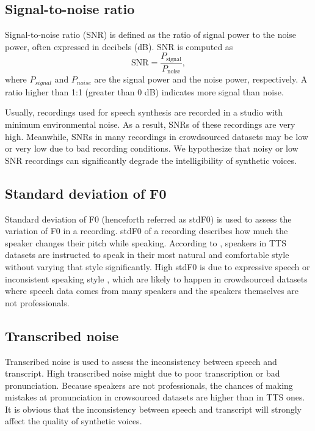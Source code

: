 \documentclass[12pt]{article}
\begin{document}
\subsection{Signal-to-noise ratio}
Signal-to-noise ratio (SNR) is defined as the ratio of signal power to the noise power, often expressed in decibels (dB). SNR is computed as
\begin{equation}\label{exp_SNR}
    \text{SNR} = \frac{P_\text{signal}}{P_\text{noise}},
\end{equation}
where $P_{signal}$ and $P_{noise}$ are the signal power and the noise power, respectively. A ratio higher than 1:1 (greater than 0 dB) indicates more signal than noise.

Usually, recordings used for speech synthesis are recorded in a studio with minimum environmental noise. As a result, SNRs of these recordings are very high. Meanwhile, SNRs in many recordings in crowdsourced datasets may be low or very low due to bad recording conditions.
We hypothesize that noisy or low SNR recordings can significantly degrade the intelligibility of synthetic voices.

\subsection{Standard deviation of F0}
Standard deviation of F0 (henceforth referred as stdF0) is used to assess the variation of F0 in a recording. stdF0 of a recording describes how much the speaker changes their pitch while speaking. According to \cite{buildingCorpus}, speakers in TTS datasets are instructed to speak in their most natural and comfortable style without varying that style significantly. High stdF0 is due to expressive speech or inconsistent speaking style \cite{usingAudiobooks}, \cite{dataSelectionFoundCorpuses} which are likely to happen in crowdsourced datasets where speech data comes from many speakers and the speakers themselves are not professionals.

\subsection{Transcribed noise}
Transcribed noise is used to assess the inconsistency between speech and transcript. High transcribed noise might due to poor transcription or bad pronunciation. Because speakers are not professionals, the chances of making mistakes at pronunciation in crowsourced datasets are higher than in TTS ones. It is obvious that the inconsistency between speech and transcript will strongly affect the quality of synthetic voices.
\end{document}
